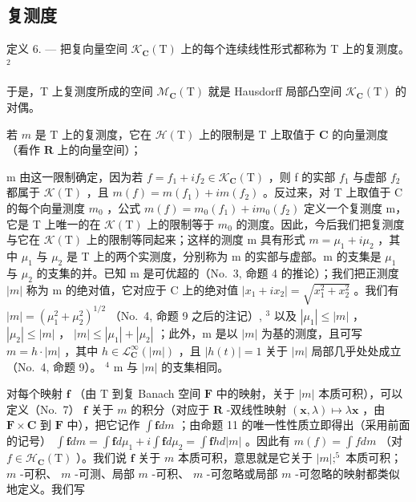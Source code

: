 \subsection{复测度}

定义 6. --- 把复向量空间 \(\mathcal{K}_{\mathbf{C}}(\mathrm{T})\) 上的每个连续线性形式都称为 T 上的复测度。 \(^{2}\)

于是，T 上复测度所成的空间 \(\mathcal{M}_{\mathbf{C}}(\mathrm{T})\) 就是 Hausdorff 局部凸空间 \(\mathcal{K}_{\mathbf{C}}(\mathrm{T})\) 的对偶。

若 \(m\) 是 \(\mathrm{T}\) 上的复测度，它在 \(\mathcal{H}(\mathrm{T})\) 上的限制是 \(\mathrm{T}\) 上取值于 \(\mathbf{C}\) 的向量测度（看作 \(\mathbf{R}\) 上的向量空间）；

m 由这一限制确定，因为若 \(f = f_{1} + if_{2} \in \mathcal{K}_{\mathbf{C}}(\mathrm{T})\) ，则 f 的实部 \(f_{1}\) 与虚部 \(f_{2}\) 都属于 \(\mathcal{K}(\mathrm{T})\) ，且 \(m(f) = m(f_{1}) + im(f_{2})\) 。反过来，对 T 上取值于 C 的每个向量测度 \(m_{0}\) ，公式 \(m(f) = m_{0}(f_{1}) + im_{0}(f_{2})\) 定义一个复测度 m，它是 T 上唯一的在 \(\mathcal{K}(\mathrm{T})\) 上的限制等于 \(m_{0}\) 的测度。因此，今后我们把复测度与它在 \(\mathcal{K}(\mathrm{T})\) 上的限制等同起来；这样的测度 m 具有形式 \(m = \mu_{1} + i\mu_{2}\) ，其中 \(\mu_{1}\) 与 \(\mu_{2}\) 是 T 上的两个实测度，分别称为 m 的实部与虚部。m 的支集是 \(\mu_{1}\) 与 \(\mu_{2}\) 的支集的并。已知 m 是可优超的（No.~3, 命题 4 的推论）；我们把正测度 \(|m|\) 称为 m 的绝对值，它对应于 C 上的绝对值 \(|x_{1} + ix_{2}| = \sqrt{x_{1}^{2} + x_{2}^{2}}\) 。我们有 \(|m| = (\mu_{1}^{2} + \mu_{2}^{2})^{1/2}\) （No.~4, 命题 9 之后的注记）, \(^{3}\) 以及 \(|\mu_{1}| \leqslant |m|\) ， \(|\mu_{2}| \leqslant |m|\) ， \(|m| \leqslant |\mu_{1}| + |\mu_{2}|\) ；此外，m 是以 \(|m|\) 为基的测度，且可写 \(m = h \cdot |m|\) ，其中 \(h \in \mathcal{L}_{\mathbf{C}}^{\infty}(|m|)\) ，且 \(|h(t)| = 1\) 关于 \(|m|\) 局部几乎处处成立（No.~4, 命题 9）。 \(^{4}\) m 与 \(|m|\) 的支集相同。

对每个映射 \(\mathbf{f}\) （由 \(\mathrm{T}\) 到复 Banach 空间 \(\mathbf{F}\) 中的映射，关于 \(|m|\) 本质可积），可以定义（No.~7） \(\mathbf{f}\) 关于 \(m\) 的积分（对应于 \(\mathbf{R}\) -双线性映射 \((\mathbf{x},\lambda)\mapsto\lambda\mathbf{x}\) ，由 \(\mathbf{F}\times\mathbf{C}\) 到 \(\mathbf{F}\) 中），把它记作 \(\int\mathbf{f}dm\) ；由命题 11 的唯一性性质立即得出（采用前面的记号） \(\int\mathbf{f}dm=\int\mathbf{f}d\mu_{1}+i\int\mathbf{f}d\mu_{2}=\int\mathbf{f}hd|m|\) 。因此有 \(m(f)=\int fdm\) （对 \(f\in\mathcal{H}_{\mathbf{C}}(\mathrm{T})\) ）。我们说 \(\mathbf{f}\) 关于 \(m\) 本质可积，意思就是它关于 \(|m|;^{5}\) 本质可积； \(m\) -可积、 \(m\) -可测、局部 \(m\) -可积、 \(m\) -可忽略或局部 \(m\) -可忽略的映射都类似地定义。我们写

